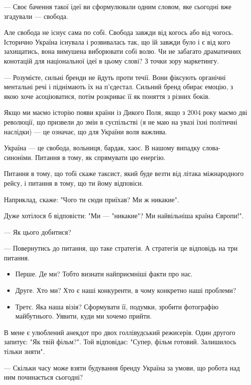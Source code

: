 --- Своє бачення такої ідеї ви сформулювали одним словом, яке сьогодні вже
згадували --- свобода. 

Але свобода не існує сама по собі. Свобода завжди від когось або від чогось.
Історично Україна існувала і розвивалась так, що їй завжди було і є від кого
захищатись, вона вимушена виборювати собі волю. Чи не забагато драматичних
конотацій для національної ідеї в цьому слові? З точки зору маркетингу.

--- Розумієте, сильні бренди не йдуть проти течії. Вони фіксують органічні
ментальні речі і піднімають їх на п’єдестал. Сильний бренд обирає емоцію, з
якою хоче асоціюватися, потім розкриває її як поняття з різних боків.

Якщо ми маємо історію появи країни із Дикого Поля, якщо з 2004 року маємо дві
революції, що призвели до змін в суспільстві (я не маю на увазі їхні політичні
наслідки) --- це означає, що для України воля важлива. 

Україна --- це свобода, вольниця, бардак, хаос. В нашому випадку слова-синоніми.
Питання в тому, як спрямувати цю енергію. 

Питання в тому, що тобі скаже таксист, який буде везти від літака міжнародного
рейсу, і питання в тому, що ти йому відповіси.

Наприклад, скаже: "Чого ти сюди приїхав? Ми ж никакие".

Дуже хотілося б відповісти: "Ми --- "никакие"? Ми найвільніша країна Європи!".

--- Як цього добитися?

--- Повернутись до питання, що таке стратегія. А стратегія це відповідь на три
питання.

\begin{itemize}
	\item Перше. Де ми? Тобто визнати найприємніші факти про нас.
	\item Друге. Хто ми? Хто є наші конкуренти, в чому конкретно наші проблеми?
	\item Третє. Яка наша візія? Сформувати її, подумки, зробити фотографію майбутнього. Уявити, куди ми хочемо прийти.
\end{itemize}

В мене є улюблений анекдот про двох голлівудський режисерів. Один другого
запитує: "Як твій фільм?". Той відповідає: "Супер, фільм готовий. Залишилось
тільки зняти".

--- Скільки часу може взяти будування бренду Україна за умови, що робота над ним
починається сьогодні?

